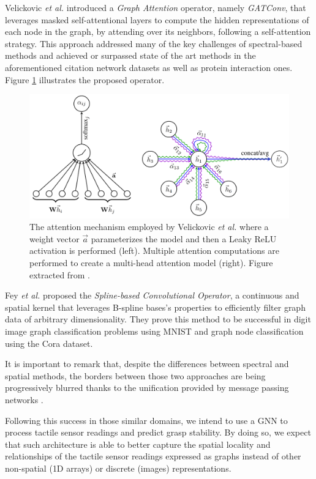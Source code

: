 Velickovic \emph{et al.} \cite{Velickovic2017} introduced a \emph{Graph Attention} operator, namely \emph{GATConv}, that leverages masked self-attentional layers to compute the hidden representations of each node in the graph, by attending over its neighbors, following a self-attention strategy. This approach addressed many of the key challenges of spectral-based methods and achieved or surpassed state of the art methods in the aforementioned citation network datasets as well as protein interaction ones. Figure \ref{fig:tactile:velickovic} illustrates the proposed operator.

\begin{figure}[!htb]
    \centering
    \includegraphics[width=0.95\linewidth]{Figures/Tactile/velickovic}
    \caption{The attention mechanism employed by Velickovic \emph{et al.}\cite{Velickovic2017} where a weight vector $\vec{a}$ parameterizes the model and then a Leaky \ac{ReLU} activation is performed (left). Multiple attention computations are performed to create a multi-head attention model (right). Figure extracted from \cite{Velickovic2017}.}
    \label{fig:tactile:velickovic}
\end{figure}

Fey \emph{et al.} \cite{Fey2018} proposed the \emph{Spline-based Convolutional Operator}, a continuous and spatial kernel that leverages B-spline bases's properties to efficiently filter graph data of arbitrary dimensionality. They prove this method to be successful in digit image graph classification problems using \acs{MNIST} and graph node classification using the Cora dataset.

It is important to remark that, despite the differences between spectral and spatial methods, the borders between those two approaches are being progressively blurred thanks to the unification provided by message passing networks \cite{Gilmer2017}.

Following this success in those similar domains, we intend to use a \acs{GNN} to process tactile sensor readings and predict grasp stability. By doing so, we expect that such architecture is able to better capture the spatial locality and relationships of the tactile sensor readings expressed as graphs instead of other non-spatial (\acs{1D} arrays) or discrete (images) representations.

